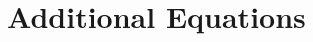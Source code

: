 \documentclass[twocolumn,aps,prd,floatfix,preprintnumbers,a4paper,nofootinbib,
superscriptaddress,10pt]{revtex4-1}
\def\gmvr#1{greedy-multivariate-rational#1
  (\texttt{GMVR}#1)\gdef\gmvr{\texttt{GMVR}}}
\begin{document}
\newpage

%
\appendix


\newpage
\section{Additional Equations}
\label{app:eqns}



%
%
\begin{widetext}
  
\end{widetext}

\end{document}
